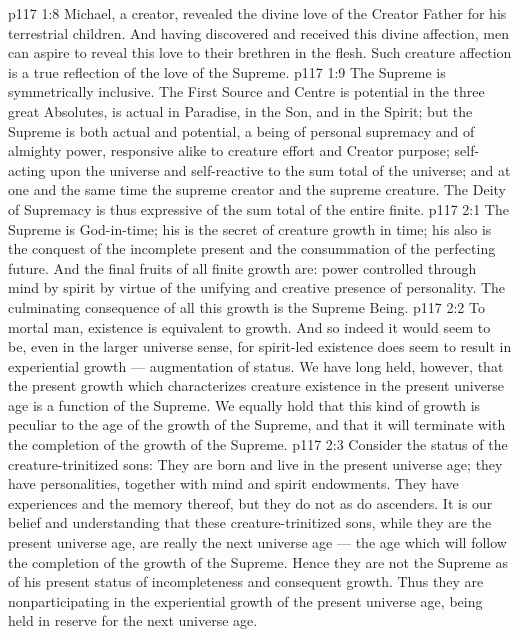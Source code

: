 \vs p117 1:8 Michael, a creator, revealed the divine love of the Creator Father for his terrestrial children. And having discovered and received this divine affection, men can aspire to reveal this love to their brethren in the flesh. Such creature affection is a true reflection of the love of the Supreme.
\vs p117 1:9 The Supreme is symmetrically inclusive. The First Source and Centre is potential in the three great Absolutes, is actual in Paradise, in the Son, and in the Spirit; but the Supreme is both actual and potential, a being of personal supremacy and of almighty power, responsive alike to creature effort and Creator purpose; self\hyp{}acting upon the universe and self\hyp{}reactive to the sum total of the universe; and at one and the same time the supreme creator and the supreme creature. The Deity of Supremacy is thus expressive of the sum total of the entire finite.
\vs p117 2:1 The Supreme is God\hyp{}in\hyp{}time; his is the secret of creature growth in time; his also is the conquest of the incomplete present and the consummation of the perfecting future. And the final fruits of all finite growth are: power controlled through mind by spirit by virtue of the unifying and creative presence of personality. The culminating consequence of all this growth is the Supreme Being.
\vs p117 2:2 To mortal man, existence is equivalent to growth. And so indeed it would seem to be, even in the larger universe sense, for spirit\hyp{}led existence does seem to result in experiential growth --- augmentation of status. We have long held, however, that the present growth which characterizes creature existence in the present universe age is a function of the Supreme. We equally hold that this kind of growth is peculiar to the age of the growth of the Supreme, and that it will terminate with the completion of the growth of the Supreme.
\vs p117 2:3 \pc Consider the status of the creature\hyp{}trinitized sons: They are born and live in the present universe age; they have personalities, together with mind and spirit endowments. They have experiences and the memory thereof, but they do not  as do ascenders. It is our belief and understanding that these creature\hyp{}trinitized sons, while they are  the present universe age, are really  the next universe age --- the age which will follow the completion of the growth of the Supreme. Hence they are not  the Supreme as of his present status of incompleteness and consequent growth. Thus they are nonparticipating in the experiential growth of the present universe age, being held in reserve for the next universe age.
